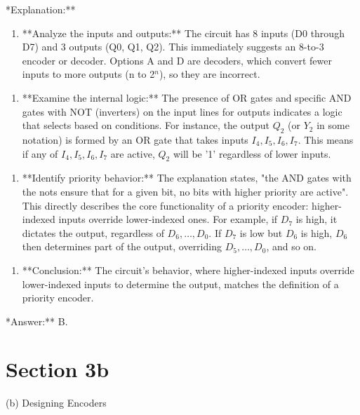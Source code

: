 \documentclass{article}
\begin{document}
\item **Explanation:**

    \begin{enumerate}
\item **Analyze the inputs and outputs:** The circuit has 8 inputs (D0 through D7) and 3 outputs (Q0, Q1, Q2). This immediately suggests an 8-to-3 encoder or decoder. Options A and D are decoders, which convert fewer inputs to more outputs (n to 2$^n$), so they are incorrect.

\end{enumerate}
    \begin{enumerate}
\item **Examine the internal logic:** The presence of OR gates and specific AND gates with NOT (inverters) on the input lines for outputs indicates a logic that selects based on conditions. For instance, the output $Q_2$ (or $Y_2$ in some notation) is formed by an OR gate that takes inputs $I_4, I_5, I_6, I_7$. This means if any of $I_4, I_5, I_6, I_7$ are active, $Q_2$ will be '1' regardless of lower inputs.

\end{enumerate}
    \begin{enumerate}
\item **Identify priority behavior:** The explanation states, "the AND gates with the nots ensure that for a given bit, no bits with higher priority are active". This directly describes the core functionality of a priority encoder: higher-indexed inputs override lower-indexed ones. For example, if $D_7$ is high, it dictates the output, regardless of $D_6, \dots, D_0$. If $D_7$ is low but $D_6$ is high, $D_6$ then determines part of the output, overriding $D_5, \dots, D_0$, and so on.

\end{enumerate}
    \begin{enumerate}
\item **Conclusion:** The circuit's behavior, where higher-indexed inputs override lower-indexed inputs to determine the output, matches the definition of a priority encoder.

\end{enumerate}
\item **Answer:** B.


\section{Section 3b}

(b) Designing Encoders
\end{document}
